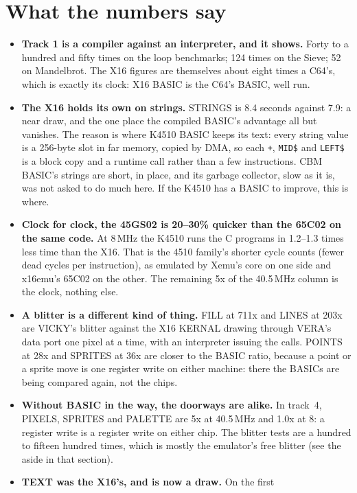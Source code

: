 \section{What the numbers say}
\begin{itemize}
\item \textbf{Track 1 is a compiler against an interpreter, and it
  shows.} Forty to a hundred and fifty times on the loop benchmarks;
  124 times on the Sieve; 52 on Mandelbrot. The X16 figures are
  themselves about eight times a C64's, which is exactly its clock:
  X16 BASIC is the C64's BASIC, well run.
\item \textbf{The X16 holds its own on strings.} STRINGS is 8.4
  seconds against 7.9: a near draw, and the one place the compiled
  BASIC's advantage all but vanishes. The reason is where K4510 BASIC
  keeps its text: every string value is a 256-byte slot in far memory,
  copied by DMA, so each \texttt{+}, \texttt{MID\$} and
  \texttt{LEFT\$} is a block copy and a runtime call rather than a few
  instructions. CBM BASIC's strings are short, in place, and its
  garbage collector, slow as it is, was not asked to do much here. If
  the K4510 has a BASIC to improve, this is where.
\item \textbf{Clock for clock, the 45GS02 is 20--30\% quicker than
  the 65C02 on the same code.} At 8\,MHz the K4510 runs the C
  programs in 1.2--1.3 times less time than the X16. That is the
  4510 family's shorter cycle counts (fewer dead cycles per
  instruction), as emulated by Xemu's core on one side and x16emu's
  65C02 on the other. The remaining 5x of the 40.5\,MHz column is the
  clock, nothing else.
\item \textbf{A blitter is a different kind of thing.} FILL at 711x
  and LINES at 203x are VICKY's blitter against the X16 KERNAL
  drawing through VERA's data port one pixel at a time, with an
  interpreter issuing the calls. POINTS at 28x and SPRITES at 36x are
  closer to the BASIC ratio, because a point or a sprite move is one
  register write on either machine: there the BASICs are being
  compared again, not the chips.
\item \textbf{Without BASIC in the way, the doorways are alike.}
  In track~4, PIXELS, SPRITES and PALETTE are 5x at 40.5\,MHz and
  1.0x at 8: a register write is a register write on either chip.
  The blitter tests are a hundred to fifteen hundred times, which
  is mostly the emulator's free blitter (see the aside in that
  section).
\item \textbf{TEXT was the X16's, and is now a draw.} On the first

\end{itemize}
